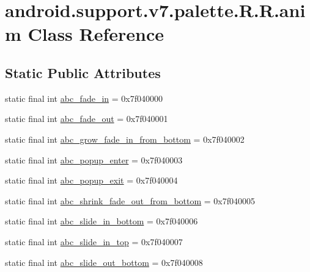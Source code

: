\hypertarget{classandroid_1_1support_1_1v7_1_1palette_1_1_r_1_1anim}{
\section{android.support.v7.palette.R.R.anim Class Reference}
\label{classandroid_1_1support_1_1v7_1_1palette_1_1_r_1_1anim}
}
\subsection*{Static Public Attributes}
\begin{CompactItemize}
\item 
static final int \hyperlink{classandroid_1_1support_1_1v7_1_1palette_1_1_r_1_1anim_e8d10554b17af6d24a695cb1c49879f4}{abc\_\-fade\_\-in} = 0x7f040000
\item 
static final int \hyperlink{classandroid_1_1support_1_1v7_1_1palette_1_1_r_1_1anim_0929d7a2be865b9d7362457945b9657f}{abc\_\-fade\_\-out} = 0x7f040001
\item 
static final int \hyperlink{classandroid_1_1support_1_1v7_1_1palette_1_1_r_1_1anim_1f8bde8b2f08f2f2f7d178725f722977}{abc\_\-grow\_\-fade\_\-in\_\-from\_\-bottom} = 0x7f040002
\item 
static final int \hyperlink{classandroid_1_1support_1_1v7_1_1palette_1_1_r_1_1anim_60c7a37693887d9bb274c050f78a12de}{abc\_\-popup\_\-enter} = 0x7f040003
\item 
static final int \hyperlink{classandroid_1_1support_1_1v7_1_1palette_1_1_r_1_1anim_910dab1e5444d3bb5223980c5cad23e0}{abc\_\-popup\_\-exit} = 0x7f040004
\item 
static final int \hyperlink{classandroid_1_1support_1_1v7_1_1palette_1_1_r_1_1anim_893dd47da164833e354aa2b0c5c4ff2a}{abc\_\-shrink\_\-fade\_\-out\_\-from\_\-bottom} = 0x7f040005
\item 
static final int \hyperlink{classandroid_1_1support_1_1v7_1_1palette_1_1_r_1_1anim_a7053381db60905a366add4fcecea879}{abc\_\-slide\_\-in\_\-bottom} = 0x7f040006
\item 
static final int \hyperlink{classandroid_1_1support_1_1v7_1_1palette_1_1_r_1_1anim_bfab90de7887a49ea2c701f2dca08a23}{abc\_\-slide\_\-in\_\-top} = 0x7f040007
\item 
static final int \hyperlink{classandroid_1_1support_1_1v7_1_1palette_1_1_r_1_1anim_7d075caf97b46400de1f9e6fa806f5c7}{abc\_\-slide\_\-out\_\-bottom} = 0x7f040008
\item 

\end{CompactItemize}
